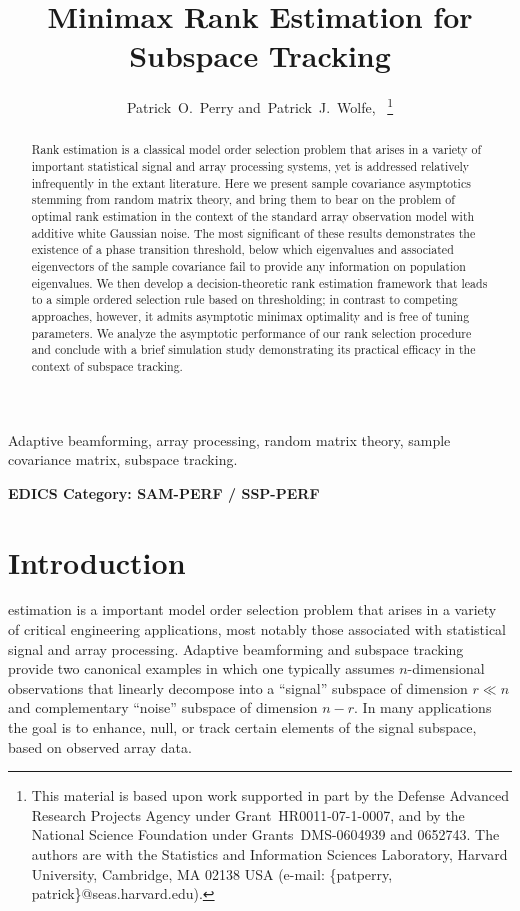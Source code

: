 \documentclass[final]{IEEEtran}
\title{Minimax Rank Estimation for Subspace Tracking}%
\author{Patrick~O.~Perry and~Patrick~J.~Wolfe,~\IEEEmembership{Senior Member,~IEEE}%
                \thanks{This material is based upon work
          supported in part by the Defense Advanced Research Projects Agency under Grant~HR0011-07-1-0007, and by the National Science Foundation under Grants~DMS-0604939 and 0652743.
          \newline \indent The authors are with the Statistics and Information Sciences Laboratory, Harvard University, Cambridge, MA 02138 USA (e-mail: \{patperry, patrick\}@seas.harvard.edu).
          }
}
\begin{document}
\maketitle

\begin{abstract}%
Rank estimation is a classical model order selection problem that arises in a variety of important statistical signal and array processing systems, yet is addressed relatively infrequently in the extant literature.  Here we present sample covariance asymptotics stemming from random matrix theory, and bring them to bear on the problem of optimal rank estimation in the context of the standard array observation model with additive white Gaussian noise.  The most significant of these results demonstrates the existence of a phase transition threshold, below which eigenvalues and associated eigenvectors of the sample covariance fail to provide any information on population eigenvalues.  We then develop a decision-theoretic rank estimation framework that leads to a simple ordered selection rule based on thresholding; in contrast to competing approaches, however, it admits asymptotic minimax optimality and is free of tuning parameters.  We analyze the asymptotic performance of our rank selection procedure and conclude with a brief simulation study demonstrating its practical efficacy in the context of subspace tracking.
\end{abstract}

\begin{IEEEkeywords}%
Adaptive beamforming, array processing, random matrix theory, sample covariance matrix, subspace tracking.
\end{IEEEkeywords}

\ifCLASSOPTIONpeerreview
\begin{center}%
\bfseries EDICS Category: SAM-PERF / SSP-PERF
\end{center}
\fi
\IEEEpeerreviewmaketitle

\section{Introduction}
\label{sec:intro}

 estimation is a important model order selection problem that arises in a variety of critical engineering applications, most notably those associated with statistical signal and array processing.  Adaptive beamforming and subspace tracking provide two canonical examples in which one typically assumes $n$-dimensional observations that linearly decompose into a ``signal'' subspace of dimension $r \ll n$ and complementary ``noise'' subspace of dimension $n - r$.  In many applications the goal is to enhance, null, or track certain elements of the signal subspace, based on observed array data.
\end{document}
